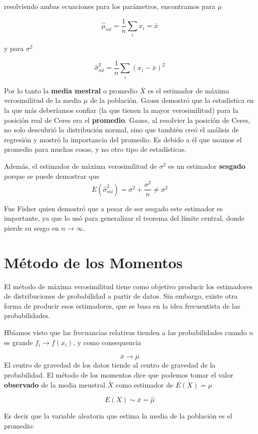 \documentclass[
]{book}
\begin{document}
resolviendo ambas ecuaciones para los parámetros, encontramos para \(\mu\)

\[\hat{\mu}_{ml}=\frac{1}{n}\sum_i x_i=\bar{x}\]

y para \(\sigma^2\)

\[\hat{\sigma}^2_{ml}=\frac{1}{n}\sum_i(x_i-\bar{x})^2\]

Por lo tanto la \textbf{media mestral} o promedio \(\bar{X}\) es el estimador de máxima verosimilitud de la media \(\mu\) de la población. Gauss demostró que la estadística en la que más deberíamos confiar (la que tienen la mayor verosimilitud) para la posición real de Ceres era el \textbf{promedio}. Gauss, al resolvier la posición de Ceres, no solo descubrió la distribución normal, sino que también creó el análisis de regresión y mostró la importancia del promedio. Es debido a él que usamos el promedio para muchas cosas, y no otro tipo de estadísticas.

Además, el estimador de máxima verosimilitud de \(\sigma^2\) es un estimador \textbf{sesgado} porque se puede demostrar que \[E(\hat{\sigma}^2_{ml})=\sigma^2+ \frac{\sigma^2}{n}\neq\sigma^2\]

Fue Fisher quien demostró que a pesar de ser sesgado este estimador es importante, ya que lo usó para generalizar el teorema del límite central, donde pierde su sesgo en \(n\rightarrow \infty\).

\hypertarget{muxe9todo-de-los-momentos}{%
\section{Método de los Momentos}\label{muxe9todo-de-los-momentos}}

El método de máxima verosimilitud tiene como objetivo producir los estimadores de distribuciones de probabilidad a partir de datos. Sin embargo, existe otra forma de producir esos estimadores, que se basa en la idea frecuentista de las probabilidades.

Hbíamos visto que las frecuancias relativas tienden a las probabilidades cuando \(n\) es grande \(f_i \rightarrow f(x_i)\), y como consequencia

\[\bar{x} \rightarrow \mu\]
El centro de gravedad de los datos tiende al centro de gravedad de la probabilidad.
El método de los momentos dice que podemos tomar el valor \textbf{observado} de la media meustral \(\bar{X}\) como estimador de \(E(X)=\mu\)

\[E(X)\sim \bar{x}=\hat{\mu}\]

Es decir que la variable aleatoria que estima la media de la población es el promedio:
\end{document}
